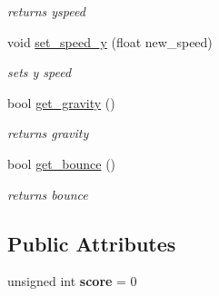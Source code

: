 \begin{DoxyCompactItemize}
\begin{DoxyCompactList}\small\item\em returns yspeed \end{DoxyCompactList}\item 
void \hyperlink{classentity_a64a214c123d3ede336ea6989c05063e7}{set\+\_\+speed\+\_\+y} (float new\+\_\+speed)
\begin{DoxyCompactList}\small\item\em sets y speed \end{DoxyCompactList}\item 
bool \hyperlink{classentity_a2e69aae60dda8b7a1b381f7e99f6913f}{get\+\_\+gravity} ()
\begin{DoxyCompactList}\small\item\em returns gravity \end{DoxyCompactList}\item 
bool \hyperlink{classentity_a0c3bddcd6f6512eb0826dfebc90e5b05}{get\+\_\+bounce} ()
\begin{DoxyCompactList}\small\item\em returns bounce \end{DoxyCompactList}\end{DoxyCompactItemize}
\subsection*{Public Attributes}
\begin{DoxyCompactItemize}
\item 
\mbox{\label{classentity_ae208c1d4002534e9c82d9c27c4b6d121}} 
unsigned int {\bfseries score} = 0
\end{DoxyCompactItemize}
